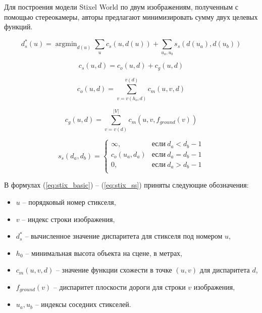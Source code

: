 \documentclass[aps,%
14pt,%
final,%
oneside,
onecolumn,%
musixtex, %
superscriptaddress,%
centertags]{extarticle} %
\DeclareMathOperator*{\argmin}{argmin}
\begin{document}
Для построения модели Stixel World по двум изображениям, полученным с помощью стереокамеры, авторы предлагают минимизировать сумму двух целевых функций.

\begin{equation}\label{eq:stix_basic}
d^*_s(u) = \argmin_{d(u)}\sum_u c_s(u, d(u)) + \sum_{u_a, u_b} s_s(d(u_a), d(u_b))
\end{equation}

\begin{equation}
c_s(u, d) = c_o(u, d) + c_g(u, d)
\end{equation}

\begin{equation}\label{eq:stix_co}
c_o(u, d) = \sum_{v=v(h_o, d)}^{v(d)} c_m(u, v, d)
\end{equation}

\begin{equation}\label{eq:stix_cg}
c_g(u, d) = \sum_{v=v(d)}^{|V|} c_m(u, v, f_{ground}(v))
\end{equation}

\begin{equation}\label{eq:stix_ss}
s_s(d_a, d_b)=
\begin{cases}
  \infty, & \text{если}\ d_a < d_b - 1 \\
  c_o(u_a, d_a) & \text{если}\ d_a = d_b - 1 \\
  0, & \text{если}\ d_a > d_b - 1 \\
\end{cases}
\end{equation}

В формулах (\ref{eq:stix_basic}) -- (\ref{eq:stix_ss}) приняты следующие обозначения:

\begin{itemize}
\item $u$ -- порядковый номер стикселя,

\item $v$ -- индекс строки изображения,

\item $d^*_s$ -- вычисленное значение диспаритета для стикселя под номером $u$,

\item $h_0$ -- минимальная высота объекта на сцене, в метрах,

\item $c_m(u, v, d)$ -- значение функции схожести в точке $(u, v)$ для диспаритета $d$,

\item $f_{ground}(v)$ -- диспаритет плоскости дороги для строки $v$ изображения,

\item $u_a, u_b$ -- индексы соседних стикселей.
\end{itemize}
\end{document}
